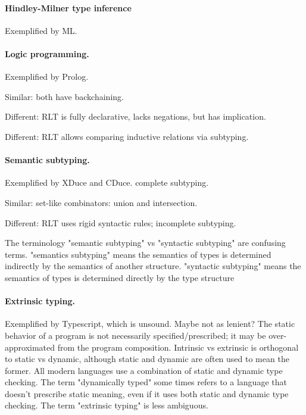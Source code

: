 \documentclass[acmsmall]{acmart}
\theoremstyle{definition}
\begin{document}
\paragraph{Hindley-Milner type inference}
Exemplified by ML.

\paragraph{Logic programming.}
Exemplified by Prolog. 

Similar: both have backchaining. 

Different: RLT is fully declarative, lacks negations, but has implication. 

Different: RLT allows comparing inductive relations via subtyping. 

\paragraph{Semantic subtyping.} 
Exemplified by XDuce and CDuce. complete subtyping.

Similar: set-like combinators: union and intersection.

Different: RLT uses rigid syntactic rules; incomplete subtyping.

The terminology "semantic subtyping" vs "syntactic subtyping" are confusing terms. 
"semantics subtyping" means the semantics of types is determined indirectly by the semantics of another structure.
"syntactic subtyping" means the semantics of types is determined directly by the type structure

\paragraph{Extrinsic typing.}
Exemplified by Typescript, which is unsound. Maybe not as lenient?  
The static behavior of a program is not necessarily specified/prescribed; 
it may be over-approximated from the program composition. 
Intrinsic vs extrinsic is orthogonal to static vs dynamic, although static and dynamic are often used to mean the former.
All modern languages use a combination of static and dynamic type checking.
The term "dynamically typed" some times refers to a language that doesn't prescribe static meaning,
even if it uses both static and dynamic type checking. The term "extrinsic typing" is less ambiguous.
\end{document}
